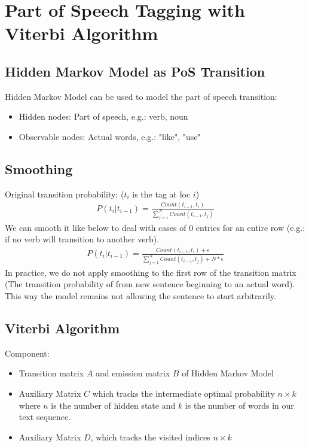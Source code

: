 \section{Part of Speech Tagging with Viterbi Algorithm} 

\subsection{Hidden Markov Model as PoS Transition}
Hidden Markov Model can be used to model the part of speech transition: 
    \begin{itemize}
        \item Hidden nodes: Part of speech, e.g.: verb, noun
        \item Observable nodes: Actual words, e.g.: "like", "use" 
    \end{itemize}

\subsection{Smoothing} 
Original transition probability: ($t_i$ is the tag at loc $i$)
    \begin{align*}
        P(t_i|t_{i-1}) = \frac{Count(t_{i-1}, t_i)}{\sum_{j=1}^N Count(t_{i-1}, t_j)}
    \end{align*}
We can smooth it like below to deal with cases of 0 entries for an entire row (e.g.: if no verb will transition to another verb).  
    \begin{align*}
        P(t_i|t_{i-1}) = \frac{Count(t_{i-1}, t_i) + \epsilon}{\sum_{j=1}^N Count(t_{i-1}, t_j) + N * \epsilon}
    \end{align*}    
In practice, we do not apply smoothing to the first row of the transition matrix (The transition probability of from new sentence beginning to an actual word). This way the model remains not allowing the sentence to start arbitrarily. 


\subsection{Viterbi Algorithm} 

Component:
    \begin{itemize}
        \item Transition matrix $A$ and emission matrix $B$ of Hidden Markov Model 
        \item Auxiliary Matrix $C$ which tracks the intermediate optimal probability $n \times k$ where $n$ is the number of hidden state and $k$ is the number of words in our text sequence. 
        \item Auxiliary Matrix $D$, which tracks the visited indices $n \times k$
    \end{itemize}

